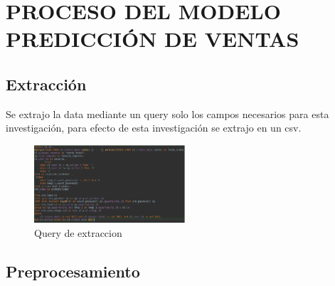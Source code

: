 \documentclass[conference]{IEEEtran}
\begin{document}
\section{PROCESO DEL MODELO PREDICCIÓN DE VENTAS}
\subsection{Extracción}
Se extrajo la data mediante un query solo los campos necesarios para esta investigación,
para efecto de esta investigación se extrajo en un csv.
\begin{figure}[H]
    \centering
    \includegraphics[width=0.5\textwidth]{preprocesamiento/query_extraccion}
    \caption{Query de extraccion}
    \label{fig:query_extraccion}
\end{figure}

\subsection{Preprocesamiento}
\end{document}
